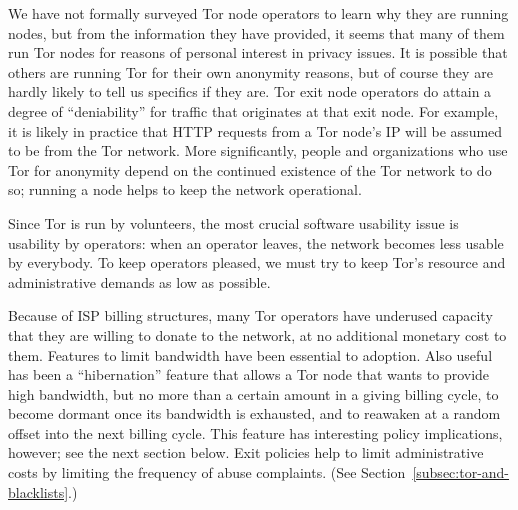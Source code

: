 \documentclass{llncs}
\begin{document}
We have not formally surveyed Tor node operators to learn why they are
running nodes, but
from the information they have provided, it seems that many of them run Tor
nodes for reasons of personal interest in privacy issues.  It is possible
that others are running Tor for their own
anonymity reasons, but of course they are
hardly likely to tell us specifics if they are.
%
Tor exit node operators do attain a degree of
``deniability'' for traffic that originates at that exit node.  For
  example, it is likely in practice that HTTP requests from a Tor node's IP
  will be assumed to be from the Tor network.
  More significantly, people and organizations who use Tor for
  anonymity depend on the
  continued existence of the Tor network to do so; running a node helps to
  keep the network operational.


Since Tor is run by volunteers, the most crucial software usability issue is
usability by operators: when an operator leaves, the network becomes less
usable by everybody.  To keep operators pleased, we must try to keep Tor's
resource and administrative demands as low as possible.

Because of ISP billing structures, many Tor operators have underused capacity
that they are willing to donate to the network, at no additional monetary
cost to them.  Features to limit bandwidth have been essential to adoption.
Also useful has been a ``hibernation'' feature that allows a Tor node that
wants to provide high bandwidth, but no more than a certain amount in a
giving billing cycle, to become dormant once its bandwidth is exhausted, and
to reawaken at a random offset into the next billing cycle.  This feature has
interesting policy implications, however; see
the next section below.
Exit policies help to limit administrative costs by limiting the frequency of
abuse complaints. (See Section~\ref{subsec:tor-and-blacklists}.)
\end{document}
